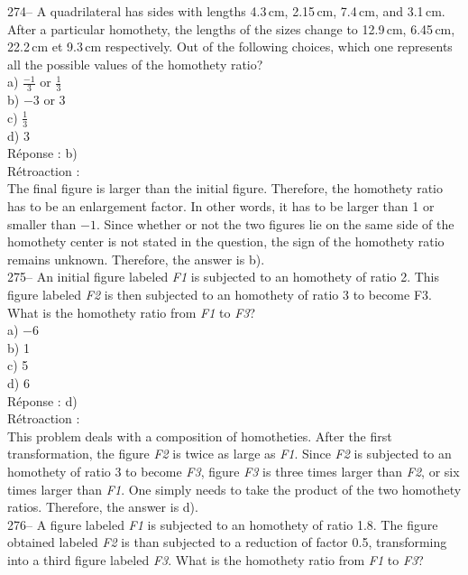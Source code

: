 \documentclass[letterpaper, 12pt]{article}
\begin{document}
274-- A quadrilateral has sides with lengths 4.3\,cm, 2.15\,cm,
7.4\,cm, and 3.1\,cm. After a particular homothety, the lengths of
the sizes change to 12.9\,cm, 6.45\,cm, 22.2\,cm et 9.3\,cm
respectively. Out of the following choices, which one represents all
the possible values of the homothety ratio?\\

a) $\frac{-1}{3}$ or $\frac{1}{3}$ \\[2mm]
b) $-3$ or 3 \\[2mm]
c) $\frac{1}{3}$\\[2mm]
d) 3 \\

R\'eponse : b)\\

R\'etroaction : \\
The final figure is larger than the initial figure. Therefore, the
homothety ratio has to be an enlargement factor. In other words, it
has to be larger than 1 or smaller than $-1$. Since whether or not
the two figures lie on the same side of the homothety center is not
stated in the question, the sign of the homothety ratio remains
unknown. Therefore, the answer is b).\\

275-- An initial figure labeled \emph{F1} is subjected to an
homothety of ratio 2. This figure labeled \emph{F2} is then
subjected to an homothety
of ratio 3 to become F3. What is the homothety ratio from \emph{F1} to \emph{F3}?\\

a) $-6$\\
b) 1\\
c) 5\\
d) 6\\

R\'eponse : d)\\

R\'etroaction : \\
This problem deals with a composition of homotheties. After the
first transformation, the figure \emph{F2} is twice as large as
\emph{F1}. Since \emph{F2} is subjected to an homothety of ratio 3
to become \emph{F3}, figure \emph{F3} is three times larger than
\emph{F2}, or six times larger than \emph{F1}. One simply needs to
take the product of the two homothety ratios. Therefore, the
answer is d).\\

276-- A figure labeled \emph{F1} is subjected to an homothety of
ratio 1.8. The figure obtained labeled \emph{F2} is than subjected
to a reduction of factor 0.5, transforming into a third figure
labeled \emph{F3}. What is the homothety ratio from \emph{F1} to \emph{F3}?\\
\end{document}
